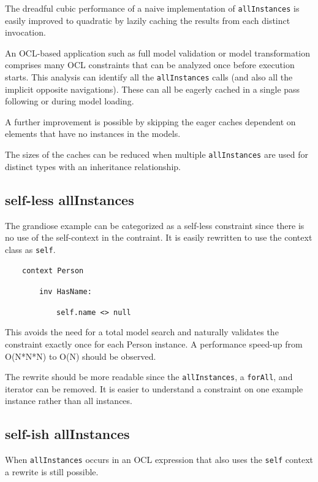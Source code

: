 \documentclass[
]{ceurart}
\begin{document}
The dreadful cubic performance of a naive implementation of \verb!allInstances! is easily improved to quadratic by lazily caching the results from each distinct invocation.

An OCL-based application such as full model validation or model transformation comprises many OCL constraints that can be analyzed once before execution starts. This analysis can identify all the \verb!allInstances! calls (and also all the implicit opposite navigations). These can all be eagerly cached in a single pass following or during model loading.

A further improvement is possible by skipping the eager caches dependent on elements that have no instances in the models. 

The sizes of the caches can be reduced when multiple \verb!allInstances! are used for distinct types with an inheritance relationship.

\subsection{self-less allInstances}

The grandiose example can be categorized as a self-less constraint since there is no use of the self-context in the contraint. It is easily rewritten to use the context class as \verb!self!.

\begin{description}[itemsep=-0.2cm]\small
\item ~~~~\verb!context Person!
\item ~~~~~~~~\verb!inv HasName:!
\item ~~~~~~~~~~~~\verb!self.name <> null!
\end{description}

This avoids the need for a total model search and naturally validates the constraint exactly once for each Person instance. A performance speed-up from O(N*N*N) to O(N) should be observed.

The rewrite should be more readable since the \verb!allInstances!, a \verb!forAll!, and iterator can be removed. It is easier to understand a constraint on  one example instance rather than all instances.

\subsection{self-ish allInstances}

When \verb!allInstances! occurs in an OCL expression that also uses the \verb!self! context a rewrite is still possible.
\end{document}
